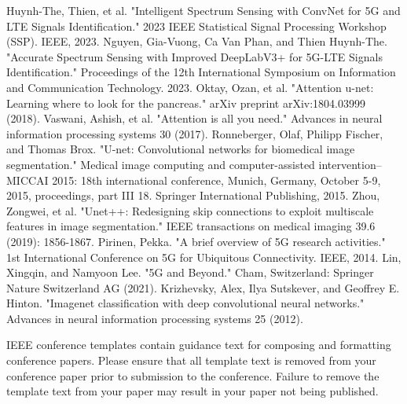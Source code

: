 \documentclass[journal]{IEEEtran} %
\begin{document}
\begin{thebibliography}{00}
     {Huynh-The, Thien, et al. "Intelligent Spectrum Sensing with ConvNet for 5G and LTE Signals Identification." 2023 IEEE Statistical Signal Processing Workshop (SSP). IEEE, 2023.}
     {Nguyen, Gia-Vuong, Ca Van Phan, and Thien Huynh-The. "Accurate Spectrum Sensing with Improved DeepLabV3+ for 5G-LTE Signals Identification." Proceedings of the 12th International Symposium on Information and Communication Technology. 2023.}
     {Oktay, Ozan, et al. "Attention u-net: Learning where to look for the pancreas." arXiv preprint arXiv:1804.03999 (2018).}
     {Vaswani, Ashish, et al. "Attention is all you need." Advances in neural information processing systems 30 (2017).}
     {Ronneberger, Olaf, Philipp Fischer, and Thomas Brox. "U-net: Convolutional networks for biomedical image segmentation." Medical image computing and computer-assisted intervention–MICCAI 2015: 18th international conference, Munich, Germany, October 5-9, 2015, proceedings, part III 18. Springer International Publishing, 2015.}
     {Zhou, Zongwei, et al. "Unet++: Redesigning skip connections to exploit multiscale features in image segmentation." IEEE transactions on medical imaging 39.6 (2019): 1856-1867.}
     {Pirinen, Pekka. "A brief overview of 5G research activities." 1st International Conference on 5G for Ubiquitous Connectivity. IEEE, 2014.}
     {Lin, Xingqin, and Namyoon Lee. "5G and Beyond." Cham, Switzerland: Springer Nature Switzerland AG (2021).}
     {Krizhevsky, Alex, Ilya Sutskever, and Geoffrey E. Hinton. "Imagenet classification with deep convolutional neural networks." Advances in neural information processing systems 25 (2012).}
\end{thebibliography}
\vspace{12pt}
\color{red}
IEEE conference templates contain guidance text for composing and formatting conference papers. Please ensure that all template text is removed from your conference paper prior to submission to the conference. Failure to remove the template text from your paper may result in your paper not being published.
\end{document}

